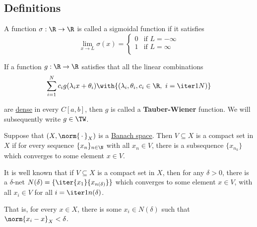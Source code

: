 \subsection{Definitions}\label{e9f040b}

\label{cf39bf4}

A function $\sigma:\R\to\R$ is called a sigmoidal function if it satisfies
$$
  \lim_{x\to L}\sigma(x)=\begin{cases}
    0 & \text{if } L=-\infty \\
    1 & \text{if } L=\infty  \\
  \end{cases}
$$

\label{e65fc0e}

If a function $g:\R\to\R$ satisfies that all the linear combinations
$$
  \sum_{i=1}^Nc_ig(\lambda_ix+\theta_i)\with{(\lambda_i,\theta_i,c_i\in\R,\ i=\iter1N)}
$$

are \href{e14819a}{dense} in every $C[a,b]$, then $g$ is called a
\textbf{Tauber-Wiener} function. We will subsequently write $g\in\TW$.

\label{afe68fa}

Suppose that $(X,\norm{\,\cdot\,}_X)$ is a \href{f894cb0}{Banach space}. Then
$V\subseteq X$ is a compact set in $X$ if for every sequence $\{x_n\}_{n\in\N}$
with all $x_n\in V$, there is a subsequence $\{x_{n_k}\}$ which converges to
some element $x\in V$.

It is well known that if $V\subseteq X$ is a compact set in $X$, then for any
$\delta>0$, there is a $\delta$-net $N(\delta)=\{\iter{x_1}{x_{n(\delta)}}\}$
which converges to some element $x\in V$, with all $x_i\in V$ for all
$i=\iter1{n(\delta)}$.

That is, for every $x\in X$, there is some $x_i\in N(\delta)$ such that
$\norm{x_i-x}_X<\delta$.

\label{aa7beb7}

